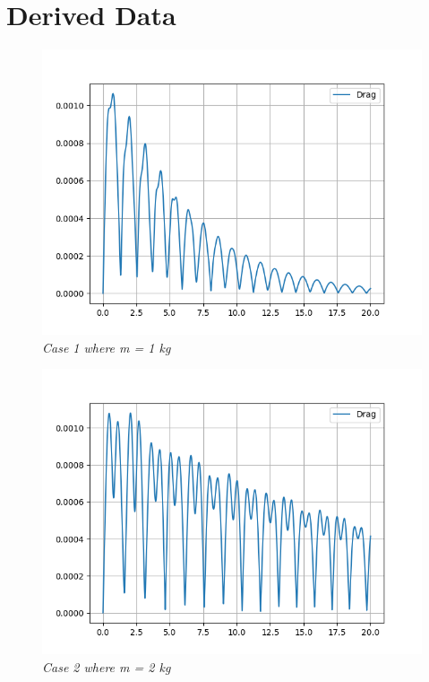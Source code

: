 \chapter{{Derived Data}}\label{dvdata}
            
    \begin{figure}[H]
        \centering
        \includegraphics{Appendix/Derived Data Pictures/dm1.png}
        \caption{\textit{Case 1 where m = 1 kg}}
        \label{}
    \end{figure}
            
    \begin{figure}[H]
        \centering
        \includegraphics{Appendix/Derived Data Pictures/dm3.png}
        \caption{\textit{Case 2 where m = 2 kg}}
        \label{}
    \end{figure}
            
